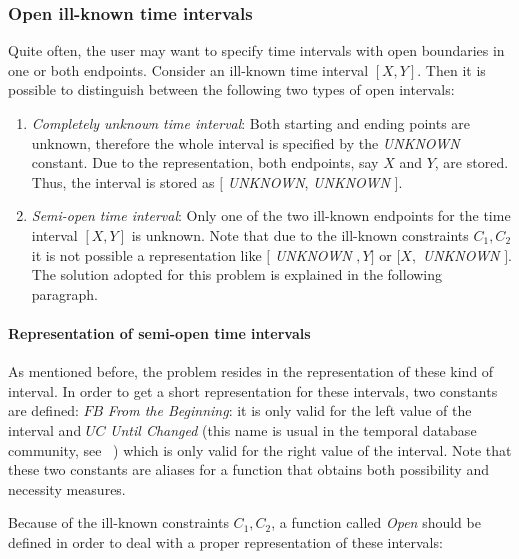 \subsubsection{\label{subsubsec:open-interval}Open ill-known time intervals}
Quite often, the user may want to specify time intervals with open boundaries in one or both endpoints. Consider an ill-known time interval $\left[X, Y\right]$. Then it is possible to distinguish between the following two types of open intervals:
\begin{enumerate}
\item
\begin{definition}
\emph{Completely unknown time interval}: Both starting and ending points are unknown, therefore the whole interval is specified by the \emph{UNKNOWN} constant. Due to the representation, both endpoints, say $X$ and $Y$, are stored. Thus, the interval is stored as $[$ \emph{UNKNOWN}, \emph{UNKNOWN} $]$. 
\end{definition}

\item
\begin{definition}
\emph{Semi-open time interval}: Only one of the two ill-known endpoints for the time interval $\left[X, Y\right]$ is unknown. Note that due to the ill-known constraints $C_{1}, C_{2}$ it is not possible a representation like $[$ \emph{UNKNOWN} $, Y]$ or $[X, $ \emph{UNKNOWN} $]$. The solution adopted for this problem is explained in the following paragraph. 
\end{definition}
\end{enumerate}

\paragraph{Representation of semi-open time intervals}
As mentioned before, the problem resides in the representation of these kind of interval. In order to get a short representation for these intervals, two constants are defined: $FB$ \emph{From the Beginning}: it is only valid for the left value of the interval and $UC$ \emph{Until Changed} (this name is usual in the temporal database community, see ~\cite{Jensen1994}) which is only valid for the right value of the interval. Note that these two constants are aliases for a function that obtains both possibility and necessity measures. 

Because of the ill-known constraints $C_{1}, C_{2}$, a function called \emph{Open} should be defined in order to deal with a proper representation of these intervals:

